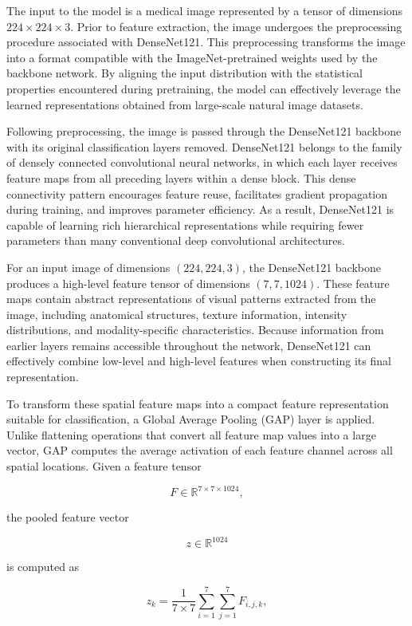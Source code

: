 The input to the model is a medical image represented by a tensor of dimensions \(224 \times 224 \times 3\). Prior to feature extraction, the image undergoes the preprocessing procedure associated with DenseNet121. This preprocessing transforms the image into a format compatible with the ImageNet-pretrained weights used by the backbone network. By aligning the input distribution with the statistical properties encountered during pretraining, the model can effectively leverage the learned representations obtained from large-scale natural image datasets.

Following preprocessing, the image is passed through the DenseNet121 backbone with its original classification layers removed. DenseNet121 belongs to the family of densely connected convolutional neural networks, in which each layer receives feature maps from all preceding layers within a dense block. This dense connectivity pattern encourages feature reuse, facilitates gradient propagation during training, and improves parameter efficiency. As a result, DenseNet121 is capable of learning rich hierarchical representations while requiring fewer parameters than many conventional deep convolutional architectures.

For an input image of dimensions \((224,224,3)\), the DenseNet121 backbone produces a high-level feature tensor of dimensions \((7,7,1024)\). These feature maps contain abstract representations of visual patterns extracted from the image, including anatomical structures, texture information, intensity distributions, and modality-specific characteristics. Because information from earlier layers remains accessible throughout the network, DenseNet121 can effectively combine low-level and high-level features when constructing its final representation.

To transform these spatial feature maps into a compact feature representation suitable for classification, a Global Average Pooling (GAP) layer is applied. Unlike flattening operations that convert all feature map values into a large vector, GAP computes the average activation of each feature channel across all spatial locations. Given a feature tensor

\[
F \in \mathbb{R}^{7 \times 7 \times 1024},
\]

the pooled feature vector

\[
z \in \mathbb{R}^{1024}
\]

is computed as

\[
z_k=
\frac{1}{7 \times 7}
\sum_{i=1}^{7}
\sum_{j=1}^{7}
F_{i,j,k},
\]

